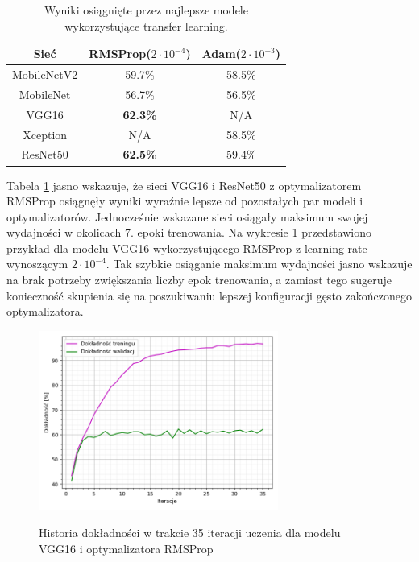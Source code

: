 \begin{table}[H]
  \centering
  \caption{Wyniki osiągnięte przez najlepsze modele wykorzystujące transfer learning.}
    \begin{tabular}{ |c|c|c| }
    \hline
    Sieć & RMSProp($2\cdot10^{-4}$) & Adam($2\cdot10^{-3}$) \\
    \hline
    MobileNetV2 & 59.7\% & 58.5\% \\ 
    MobileNet & 56.7\% & 56.5\% \\ 
    VGG16 & \textbf{62.3\%} & N/A \\
    Xception & N/A & 58.5\% \\ 
    ResNet50 & \textbf{62.5\%} & 59.4\% \\ 
    \hline
    \end{tabular}
  \label{tab:5.13}
\end{table}

Tabela \ref{tab:5.13} jasno wskazuje, że sieci VGG16 i ResNet50 z optymalizatorem RMSProp osiągnęły wyniki wyraźnie lepsze od pozostałych par modeli i optymalizatorów. Jednocześnie wskazane sieci osiągały maksimum swojej wydajności w okolicach 7. epoki trenowania. Na wykresie \ref{pic:5.6} przedstawiono przykład dla modelu VGG16 wykorzystującego RMSProp z learning rate wynoszącym $2\cdot10^{-4}$. Tak szybkie osiąganie maksimum wydajności jasno wskazuje na brak potrzeby zwiększania liczby epok trenowania, a zamiast tego sugeruje konieczność skupienia się na poszukiwaniu lepszej konfiguracji gęsto zakończonego optymalizatora.

\begin{figure}[H]
    \caption{Historia dokładności w trakcie 35 iteracji uczenia dla modelu VGG16 i optymalizatora RMSProp}
    \centering
    \includegraphics[width=0.7\textwidth]{wykres6.png}
    \label{pic:5.6}
\end{figure}

